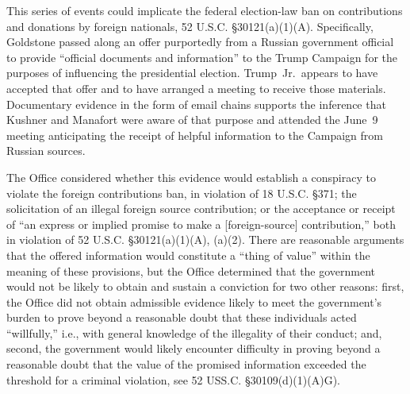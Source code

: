 This series of events could implicate the federal election-law ban on contributions and donations by foreign nationals, 52 U.S.C. \S 30121(a)(1)(A).
Specifically, Goldstone passed along an offer purportedly from a Russian government official to provide ``official documents and information'' to the Trump Campaign for the purposes of influencing the presidential election.
Trump~Jr.\ appears to have accepted that offer and to have arranged a meeting to receive those materials.
Documentary evidence in the form of email chains supports the inference that Kushner and Manafort were aware of that purpose and attended the June~9 meeting anticipating the receipt of helpful information to the Campaign from Russian sources.

The Office considered whether this evidence would establish a conspiracy to violate the foreign contributions ban, in violation of 18 U.S.C. \S 371; the solicitation of an illegal foreign source contribution; or the acceptance or receipt of ``an express or implied promise to make a [foreign-source] contribution,'' both in violation of 52 U.S.C. \S 30121(a)(1)(A), (a)(2).
There are reasonable arguments that the offered information would constitute a ``thing of value'' within the meaning of these provisions, but the Office determined that the government would not be likely to obtain and sustain a conviction for two other reasons: first, the Office did not obtain admissible evidence likely to meet the government's burden to prove beyond a reasonable doubt that these individuals acted ``willfully,'' i.e., with general knowledge of the illegality of their conduct; and, second, the government would likely encounter difficulty in proving beyond a reasonable doubt that the value of the promised information exceeded the threshold for a criminal violation, see 52 USS.C. \S 30109(d)(1)(A)G).

